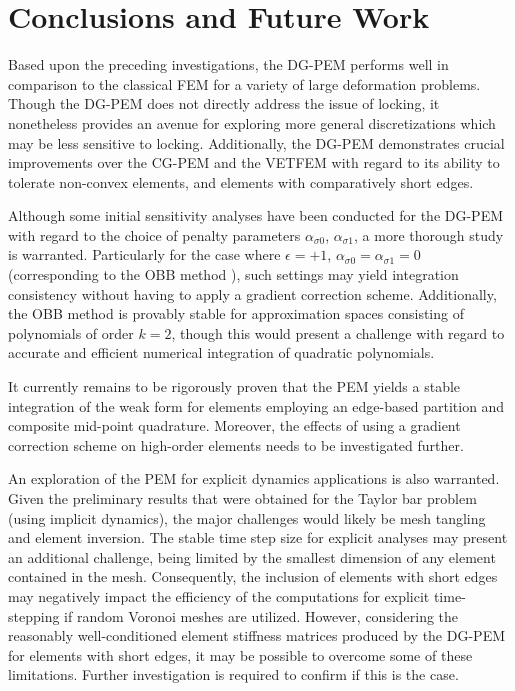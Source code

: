 \chapter{Conclusions and Future Work} \label{ch:future_work}
%
Based upon the preceding investigations, the DG-PEM performs well in comparison to the classical FEM for a variety of large deformation problems. Though the DG-PEM does not directly address the issue of locking, it nonetheless provides an avenue for exploring more general discretizations which may be less sensitive to locking. Additionally, the DG-PEM demonstrates crucial improvements over the CG-PEM and the VETFEM with regard to its ability to tolerate non-convex elements, and elements with comparatively short edges.

Although some initial sensitivity analyses have been conducted for the DG-PEM with regard to the choice of penalty parameters $\alpha_{\sigma0}$, $\alpha_{\sigma1}$, a more thorough study is warranted. Particularly for the case where $\epsilon = +1$, $\alpha_{\sigma0} = \alpha_{\sigma1} = 0$ (corresponding to the OBB method \cite{Oden:98}), such settings may yield integration consistency without having to apply a gradient correction scheme. Additionally, the OBB method is provably stable for approximation spaces consisting of polynomials of order $k=2$, though this would present a challenge with regard to accurate and efficient numerical integration of quadratic polynomials.

It currently remains to be rigorously proven that the PEM yields a stable integration of the weak form for elements employing an edge-based partition and composite mid-point quadrature. Moreover, the effects of using a gradient correction scheme on high-order elements needs to be investigated further.

An exploration of the PEM for explicit dynamics applications is also warranted. Given the preliminary results that were obtained for the Taylor bar problem (using implicit dynamics), the major challenges would likely be mesh tangling and element inversion. The stable time step size for explicit analyses may present an additional challenge, being limited by the smallest dimension of any element contained in the mesh. Consequently, the inclusion of elements with short edges may negatively impact the efficiency of the computations for explicit time-stepping if random Voronoi meshes are utilized. However, considering the reasonably well-conditioned element stiffness matrices produced by the DG-PEM for elements with short edges, it may be possible to overcome some of these limitations. Further investigation is required to confirm if this is the case.


